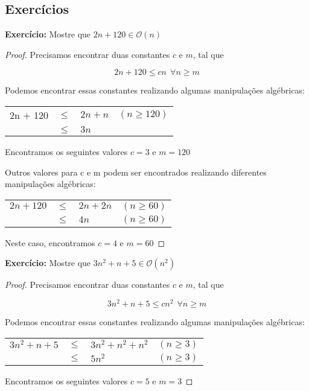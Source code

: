 \subsection{Exercícios}

\textbf{Exercício:} Mostre que $2n+ 120 \in \mathcal{O}(n)$

\begin{proof}
Precisamos encontrar duas constantes $c$ e $m$, tal que

$$
2n + 120 \leq cn ~~\forall n \geq m
$$

Podemos encontrar essas constantes realizando algumas manipulações algébricas:

\begin{tabular}{llll}
2n + 120 & $\leq$ &  $2n + n$ & $(n \geq 120)$\\
         & $\leq$ &  $3n$ & \\ 
\end{tabular}

Encontramos os seguintes valores $c = 3$ e $m = 120$

Outros valores para c e m podem ser encontrados realizando diferentes manipulações algébricas:


\begin{tabular}{llll}
$2n + 120$ & $\leq$ &  $2n + 2n$ & $(n \geq 60)$\\
         & $\leq$ &  $4n$ & $(n \geq 60)$\\ 
\end{tabular}

Neste caso, encontramos $c=4$ e $m = 60$

\end{proof}


\textbf{Exercício:} Mostre que $3n^2+ n + 5 \in \mathcal{O}(n^2)$


\begin{proof}
Precisamos encontrar duas constantes $c$ e $m$, tal que

$$
3n^2 + n + 5 \leq cn^2 ~~\forall n \geq m
$$

Podemos encontrar essas constantes realizando algumas manipulações algébricas:

\begin{tabular}{llll}
$3n^2 + n + 5$ & $\leq$ &  $3n^2 + n^2 + n^2$ & $(n \geq 3)$\\
               & $\leq$ &  $5n^2$ & $(n \geq 3)$\\ 
\end{tabular}

Encontramos os seguintes valores $c = 5$ e $m = 3$


\end{proof}


